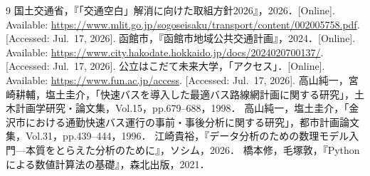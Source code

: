 \documentclass[openany,11pt,papersize,dvipdfm]{jsbook}
\begin{document}
\begin{thebibliography}{9}
 国土交通省，『「交通空白」解消に向けた取組方針2026』，2026．[Online]. Available: \url{https://www.mlit.go.jp/sogoseisaku/transport/content/002005758.pdf}. [Accessed: Jul.~17, 2026].
 函館市，『函館市地域公共交通計画』，2024．[Online]. Available: \url{https://www.city.hakodate.hokkaido.jp/docs/2024020700137/}. [Accessed: Jul.~17, 2026].
 公立はこだて未来大学，「アクセス」．[Online]. Available: \url{https://www.fun.ac.jp/access}. [Accessed: Jul.~17, 2026].
 高山純一，宮崎耕輔，塩土圭介，「快速バスを導入した最適バス路線網計画に関する研究」，土木計画学研究・論文集，Vol.15，pp.679--688，1998．
 高山純一，塩土圭介，「金沢市における通勤快速バス運行の事前・事後分析に関する研究」，都市計画論文集，Vol.31，pp.439--444，1996．
 江崎貴裕，『データ分析のための数理モデル入門---本質をとらえた分析のために』，ソシム，2026．
 橋本修，毛塚敦，『Pythonによる数値計算法の基礎』，森北出版，2021．
\end{thebibliography}

% 
% 
\end{document}

